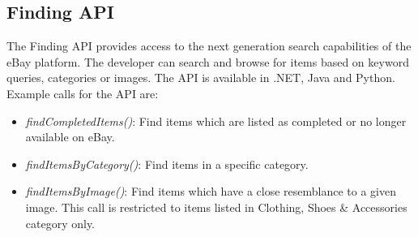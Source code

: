 \subsection{Finding API}
The Finding API provides access to the next generation search capabilities of the eBay platform. The developer can search and browse for items based on keyword queries, categories or images. The API is available in .NET, Java and Python. Example calls for the API are:
\begin{itemize}
	\item \textit{findCompletedItems()}: Find items which are listed as completed or no longer available on eBay.
	\item \textit{findItemsByCategory()}: Find items in a specific category.
	\item \textit{findItemsByImage()}: Find items which have a close resemblance to a given image. This call is restricted to items listed in Clothing, Shoes \& Accessories category only.
\end{itemize}

